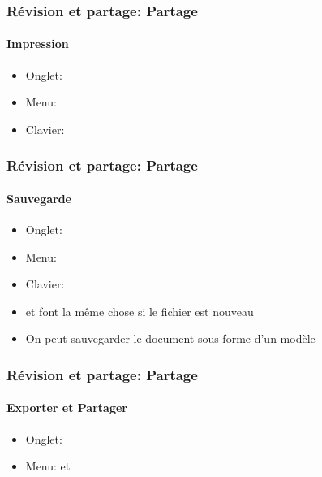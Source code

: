 \documentclass[xcolor=table]{beamer}
\begin{document}
\begin{frame}
\frametitle{Révision et partage: Partage}
\framesubtitle{Impression}

\begin{minipage}{0.61\textwidth}
	\begin{itemize}
		\item Onglet: 
		\item Menu: 
		\item Clavier: 
	\end{itemize}
\end{minipage}
\begin{minipage}{0.38\textwidth}
\end{minipage}

\end{frame}

\begin{frame}
\frametitle{Révision et partage: Partage}
\framesubtitle{Sauvegarde}

\begin{minipage}{0.61\textwidth}
	\begin{itemize}
		\item Onglet: 
		\item Menu: 
		\item Clavier: 
		\item {} et  font la même chose si le fichier est nouveau 
		\item On peut sauvegarder le document sous forme d'un modèle 
	\end{itemize}
\end{minipage}
\begin{minipage}{0.38\textwidth}
\end{minipage}

\end{frame}

\begin{frame}
\frametitle{Révision et partage: Partage}
\framesubtitle{Exporter et Partager}

\begin{minipage}{0.38\textwidth}
	\begin{itemize}
		\item Onglet: 
		\item Menu:  et 
	\end{itemize}
\end{minipage}
\begin{minipage}{0.30\textwidth}
\end{minipage}
\begin{minipage}{0.30\textwidth}
\end{minipage}

\end{frame}
\end{document}
